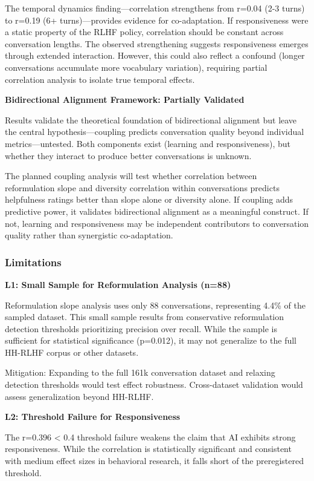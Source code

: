 The temporal dynamics finding---correlation strengthens from r=0.04 (2-3 turns) to r=0.19 (6+ turns)---provides evidence for co-adaptation. If responsiveness were a static property of the RLHF policy, correlation should be constant across conversation lengths. The observed strengthening suggests responsiveness emerges through extended interaction. However, this could also reflect a confound (longer conversations accumulate more vocabulary variation), requiring partial correlation analysis to isolate true temporal effects.

\textbf{Bidirectional Alignment Framework: Partially Validated}

Results validate the theoretical foundation of bidirectional alignment but leave the central hypothesis---coupling predicts conversation quality beyond individual metrics---untested. Both components exist (learning and responsiveness), but whether they interact to produce better conversations is unknown.

The planned coupling analysis will test whether correlation between reformulation slope and diversity correlation within conversations predicts helpfulness ratings better than slope alone or diversity alone. If coupling adds predictive power, it validates bidirectional alignment as a meaningful construct. If not, learning and responsiveness may be independent contributors to conversation quality rather than synergistic co-adaptation.

\subsubsection{Limitations}

\textbf{L1: Small Sample for Reformulation Analysis (n=88)}

Reformulation slope analysis uses only 88 conversations, representing 4.4\% of the sampled dataset. This small sample results from conservative reformulation detection thresholds prioritizing precision over recall. While the sample is sufficient for statistical significance (p=0.012), it may not generalize to the full HH-RLHF corpus or other datasets.

Mitigation: Expanding to the full 161k conversation dataset and relaxing detection thresholds would test effect robustness. Cross-dataset validation would assess generalization beyond HH-RLHF.

\textbf{L2: Threshold Failure for Responsiveness}

The r=0.396 < 0.4 threshold failure weakens the claim that AI exhibits strong responsiveness. While the correlation is statistically significant and consistent with medium effect sizes in behavioral research, it falls short of the preregistered threshold.

